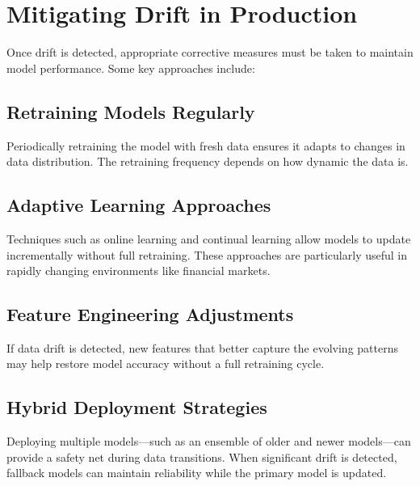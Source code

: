 \documentclass[12pt,openany]{book}
\begin{document}
\section{Mitigating Drift in Production}

Once drift is detected, appropriate corrective measures must be taken to maintain model performance. Some key approaches include:


\subsection{Retraining Models Regularly}
Periodically retraining the model with fresh data ensures it adapts to changes in data distribution. The retraining frequency depends on how dynamic the data is.


\subsection{Adaptive Learning Approaches}
Techniques such as online learning and continual learning allow models to update incrementally without full retraining. These approaches are particularly useful in rapidly changing environments like financial markets.


\subsection{Feature Engineering Adjustments}
If data drift is detected, new features that better capture the evolving patterns may help restore model accuracy without a full retraining cycle.


\subsection{Hybrid Deployment Strategies}
Deploying multiple models—such as an ensemble of older and newer models—can provide a safety net during data transitions. When significant drift is detected, fallback models can maintain reliability while the primary model is updated.






\newpage
\thispagestyle{empty}
\end{document}
